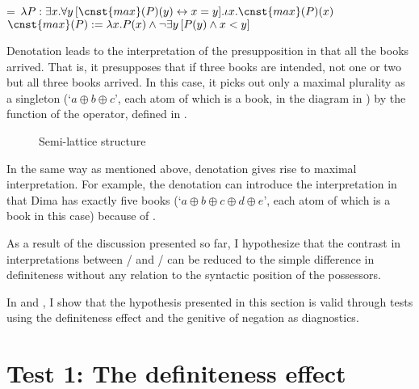 \documentclass[output=paper,
colorlinks,
citecolor=brown,
newtxmath
]{langscibook}
\begin{document}
\ea\label{sem}
\ea\label{defsem}
 = $\lambda P : \exists x . \forall y \, [ \cnst{max}(P)(y) \leftrightarrow x=y ]. \iota x . \cnst{max}(P)(x)$
\ex\label{defmax}
$\cnst{max}(P) := \lambda x . P(x) \wedge \lnot \exists y \, [ P(y) \wedge x < y ]$
\z\z

\noindent Denotation  leads to the interpretation of the presupposition in  that all the books arrived. That is, it presupposes that if three books are intended, not one or two but all three books arrived. In this case, it picks out only a maximal plurality as a singleton
(`$a\oplus b\oplus c$', each atom of which is a book, in the diagram in ) by the function of the  operator, defined in .

\begin{figure}[h]
\caption{Semi-lattice structure}\label{SLS}
\end{figure}

In the same way as mentioned above, denotation  gives rise to maximal interpretation. For example, the denotation can introduce the interpretation in  that Dima has exactly five books (`$a\oplus b\oplus c\oplus d\oplus e$', each atom of which is a book in this case) because of .

As a result of the discussion presented so far, I hypothesize that the contrast in interpretations between / and / can be reduced to the simple difference in definiteness without any relation to the syntactic position of the possessors.

In  and , I show that the hypothesis presented in this section is valid through tests using the definiteness effect and the genitive of negation as diagnostics.

\section{Test 1: The definiteness effect}\label{secDE}
\end{document}
